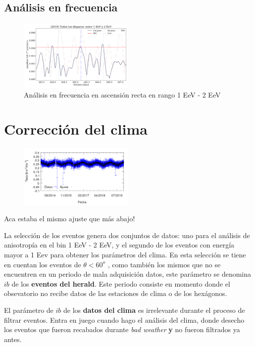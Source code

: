 \subsection{Análisis en frecuencia}

\begin{figure}[H]
	\centering
	\includegraphics[width=0.5\textwidth]{2019_AllTriggers_1_2_EeV_con_vs_sin_peso.png}
	\caption{Análisis en frecuencia en ascensión recta en rango 1 EeV - 2 EeV}
	\label{fig:consin}
\end{figure}


\section{Corrección del clima}

\begin{figure}[H]
	\centering
	\includegraphics[width=0.5\textwidth]{rate_Ajuste.png}
\end{figure}


Aca estaba el mismo ajuste que más abajo!

La selección de los eventos genera dos conjuntos de datos: uno para el análisis de anisotropía en el bin 1 EeV - 2 EeV, y el segundo de los eventos con energía mayor a 1 Eev para obtener los parámetros del clima. En esta selección se tiene en cuentan los eventos de $\theta < 60^o$ , como también  los mismos que no se encuentren en un periodo de mala adquisición datos, este parámetro se denomina $ib$ de los \textbf{eventos del herald}. Este periodo consiste en momento donde el obsevatorio no recibe datos de las estaciones de clima o de los hexágonos. 

El parámetro de $ib$ de los \textbf{datos del clima} es irrelevante durante el proceso de filtrar eventos. Entra en juego cuando hago el análisis del clima, donde desecho los eventos que fueron recabados durante \emph{bad weather} \textbf{y} no fueron filtrados ya antes. 


